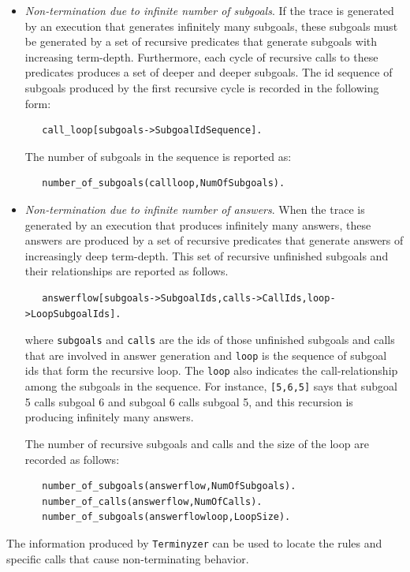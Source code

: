 \documentclass[11pt]{article}
\begin{document}
\begin{itemize}
\item \emph{Non-termination due to infinite number of subgoals}. 
  If the trace is generated by an execution that
  generates infinitely many
  subgoals, these subgoals must be generated by a set of
  recursive predicates that generate subgoals with increasing term-depth.
  Furthermore, each cycle of recursive calls to these predicates
  produces a set of deeper and deeper subgoals.
  The id sequence of subgoals produced by the first recursive cycle is
  recorded in the following form:
\begin{verbatim}
   call_loop[subgoals->SubgoalIdSequence].
\end{verbatim}
  The number of subgoals in the sequence is reported as:
\begin{verbatim}
   number_of_subgoals(callloop,NumOfSubgoals).
\end{verbatim}
  
\item \emph{Non-termination due to infinite number of answers}. 
  When the trace is generated by an execution that produces
  infinitely many answers, these answers are produced by a set of
  recursive predicates that generate answers of increasingly deep
  term-depth.
  This set of recursive unfinished subgoals and their relationships
  are reported as follows. 
\begin{verbatim}
   answerflow[subgoals->SubgoalIds,calls->CallIds,loop->LoopSubgoalIds].
\end{verbatim}
  where {\tt subgoals} and {\tt calls} are the ids of those unfinished
  subgoals and calls that are involved in answer generation 
  and {\tt loop} is the sequence of subgoal ids that form the
  recursive loop. 
  The {\tt loop} also indicates the call-relationship among the subgoals in
  the sequence. 
  For instance, {\tt [5,6,5]} says
  that subgoal 5 calls subgoal 6 and subgoal 6 calls subgoal 5, and
  this recursion is producing infinitely many answers. 

  The number of recursive subgoals and calls and the size of the loop
  are recorded as follows:
\begin{verbatim}
   number_of_subgoals(answerflow,NumOfSubgoals).
   number_of_calls(answerflow,NumOfCalls).
   number_of_subgoals(answerflowloop,LoopSize).
\end{verbatim}
\end{itemize}

The information produced by {\tt Terminyzer} can be used to locate
the rules and specific calls that cause
non-terminating behavior.
\end{document}

